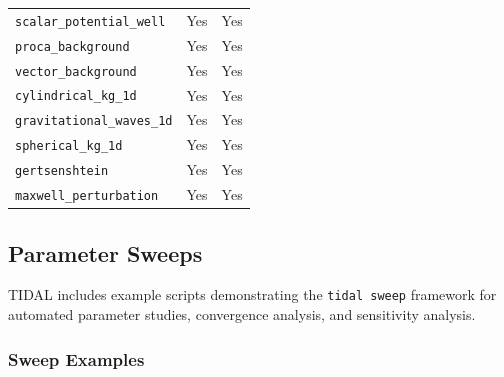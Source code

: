 \begin{table}[htbp]
\begin{tabular}{@{}lcc@{}}
\texttt{scalar\_potential\_well}  & Yes & Yes \\
\texttt{proca\_background}        & Yes & Yes \\
\texttt{vector\_background}       & Yes & Yes \\
\texttt{cylindrical\_kg\_1d}      & Yes & Yes \\
\texttt{gravitational\_waves\_1d} & Yes & Yes \\
\texttt{spherical\_kg\_1d}        & Yes & Yes \\
\texttt{gertsenshtein}            & Yes & Yes \\
\texttt{maxwell\_perturbation}    & Yes & Yes \\
\bottomrule
\end{tabular}
\end{table}

\subsection{Parameter Sweeps}

TIDAL includes example scripts demonstrating the \texttt{tidal sweep} framework for automated parameter studies, convergence analysis, and sensitivity analysis.

\subsubsection{Sweep Examples}

